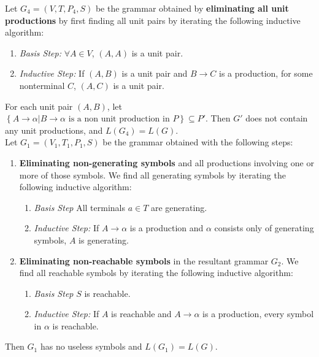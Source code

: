 Let $G_4=\left( V,T,P_4,S \right)$ be the grammar obtained by
\textbf{eliminating all unit productions} by first finding all unit pairs by
iterating the following inductive algorithm:
\begin{enumerate}
  \item \textit{Basis Step:} $\forall A\in V$, $\left( A,A \right) $ is a unit pair.
  \item \textit{Inductive Step:} If $\left( A,B \right) $ is a unit pair and
    $B\to C$ is a production, for some nonterminal $C$, $\left( A,C \right) $
    is a unit pair.
\end{enumerate}
For each unit pair $\left( A,B \right)$, let $\left\{ A\to\alpha |
B\to\alpha\text{ is a non unit production in $P$} \right\}\subseteq P'$. Then $G'$ does
not contain any unit productions, and $L(G_4)=L(G)$.\\

Let $G_1=\left( V_1,T_1,P_1,S \right) $ be the grammar
obtained with the following steps:
\begin{enumerate}
  \item \textbf{Eliminating non-generating symbols} and all productions
    involving one or more of those symbols. We find all generating symbols by
    iterating the following inductive algorithm:
    \begin{enumerate}
      \item \textit{Basis Step} All terminals $a\in T$ are generating.
      \item \textit{Inductive Step:} If $A\to\alpha$ is a production and
        $\alpha$ consists only of generating symbols, $A$ is generating.
    \end{enumerate}
  \item \textbf{Eliminating non-reachable symbols} in the resultant grammar
    $G_2$. We find all reachable symbols by iterating the following inductive
    algorithm:
    \begin{enumerate}
      \item \textit{Basis Step} $S$ is reachable.
      \item \textit{Inductive Step:} If $A$ is reachable and $A\to\alpha$ is a
        production, every symbol in $\alpha$ is reachable.
    \end{enumerate}
\end{enumerate}
Then $G_1$ has no useless symbols and $L(G_1)=L(G)$.\\

